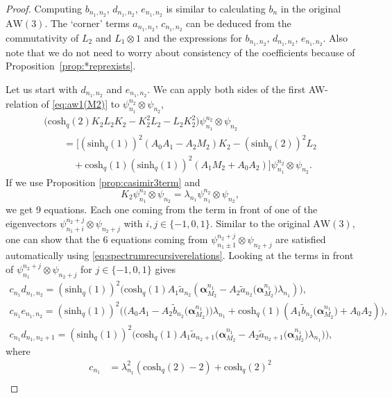 \documentclass[pdftex]{sigma}
\numberwithin{equation}{section}
\newcommand{\aw}{\mathrm{AW}\!\left(3\right)}
\newcommand{\chq}{\mathrm{cosh}_q}
\newcommand{\shq}{\mathrm{sinh}_q}
\begin{document}
\begin{proof}
	Computing $b_{n_1,n_2}$, $d_{n_1,n_2}$, $e_{n_1,n_2}$ is similar to calculating $b_n$ in the original~$\aw$. The `corner' terms $a_{n_1,n_2}$, $c_{n_1,n_2}$ can be deduced from the commutativity of $L_2$ and $L_1\otimes 1$ and the expressions for $b_{n_1,n_2}$, $d_{n_1,n_2}$, $e_{n_1,n_2}$. Also note that we do not need to worry about consistency of the coefficients because of Proposition~\ref{prop:*reprexists}.
	
Let us start with $d_{n_1,n_2}$ and $e_{n_1,n_2}$. We can apply both sides of the first AW-relation of \eqref{eq:aw1(M2)} to $\psi_{n_1}^{n_2}\otimes \psi_{n_2}$,
	\begin{gather*}
\big(\chq(2) K_2L_2K_2 - K_2^2L_2 -L_2K_2^2\big) \psi_{n_1}^{n_2}\otimes \psi_{n_2}\\
		\qquad{} = \big[(\shq(1))^2(A_0A_1 -A_2M_2)K_2 -(\shq(2))^2 L_2 \\
		\qquad\quad{} + \chq(1)(\shq(1))^2(A_1M_2+A_0A_2)\big]\psi_{n_1}^{n_2}\otimes \psi_{n_2}.
	\end{gather*}
	If we use Proposition \ref{prop:casimir3term} and
	\[
	K_2\psi_{n_1}^{n_2}\otimes \psi_{n_2}=\lambda_{n_1}\psi_{n_1}^{n_2}\otimes \psi_{n_2},
	\]
	we get 9 equations. Each one coming from the term in front of one of the eigenvectors $\psi_{n_1+i}^{n_2+j}\otimes \psi_{n_2+j}$ with $i,j\in\{-1,0,1\}$. Similar to the original $\aw$, one can show that the $6$ equations coming from $\psi_{n_1\pm 1}^{n_2+j}\otimes \psi_{n_2+j}$ are satisfied automatically using \eqref{eq:spectrumrecursiverelations}. Looking at the terms in front of $\psi_{n_1}^{n_2+j}\otimes \psi_{n_2+j}$ for $j\in\{-1,0,1\}$ gives
	\begin{gather}
		c_{n_1}d_{n_1,n_2} = (\shq(1))^2\big(\chq(1)A_1\tilde{a}_{n_2}(\bm{\alpha}_{M_2}^{n_1}-A_2\tilde{a}_{n_2}\big(\bm{\alpha}_{M_2}^{n_1}\big)\lambda_{n_1} )\big)\label{eq:dn1n2},\\
		c_{n_1}e_{n_1,n_2} = (\shq(1))^2\big(\big(A_0A_1 -A_2\tilde{b}_{n_2}\big(\bm{\alpha}_{M_2}^{n_1}\big)\big)\lambda_{n_1} \! +\chq(1)(A_1\tilde{b}_{n_2}\big(\bm{\alpha}_{M_2}^{n_1}\big)\!+A_0A_2)\big),\label{eq:en1n2}\!\!\!\!\\
		c_{n_1}d_{n_1,n_2+1} = (\shq(1))^2\big(\chq(1)A_1\tilde{a}_{n_2+1}\big(\bm{\alpha}_{M_2}^{n_1}-A_2\tilde{a}_{n_2+1}\big(\bm{\alpha}_{M_2}^{n_1}\big)\lambda_{n_1} \big)\big),\label{eq:dn1n2+1}
	\end{gather}
	where
	\begin{align*}
c_{n_1}& =\lambda_{n_1}^2\left(\chq(2)-2\right)+\chq(2)^2 \\

\end{align*}
\end{proof}
\end{document}
